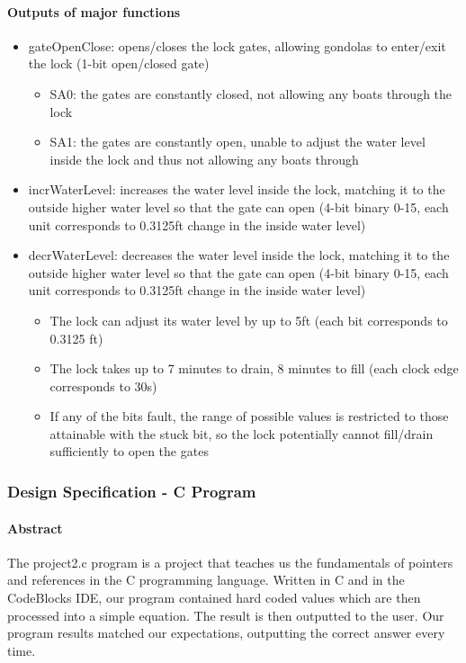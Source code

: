 \documentclass{article}
\begin{document}
      \paragraph{Outputs of major functions}
      \begin{itemize}
        \item gateOpenClose: opens/closes the lock gates, allowing gondolas to enter/exit the lock (1-bit open/closed gate)
        \begin{itemize}
          \item SA0: the gates are constantly closed, not allowing any boats through the lock
          \item SA1: the gates are constantly open, unable to adjust the water level inside the lock and thus not allowing any boats through
        \end{itemize}

        \item incrWaterLevel: increases the water level inside the lock, matching it to the outside higher water level so that the gate can open (4-bit binary 0-15, each unit corresponds to 0.3125ft change in the inside water level)
        \item decrWaterLevel: decreases the water level inside the lock, matching it to the outside higher water level so that the gate can open (4-bit binary 0-15, each unit corresponds to 0.3125ft change in the inside water level)
          \begin{itemize}
            \item The lock can adjust its water level by up to 5ft (each bit corresponds to 0.3125 ft)
            \item The lock takes up to 7 minutes to drain, 8 minutes to fill (each clock edge corresponds to 30s)
            \item If any of the bits fault, the range of possible values is restricted to those attainable with the stuck bit, so the lock potentially cannot fill/drain sufficiently to open the gates
          \end{itemize}
      \end{itemize}

    \subsubsection{Design Specification - C Program}
      \paragraph{Abstract} The project2.c program is a project that teaches us the fundamentals of pointers and references in the C programming language. Written in C and in the CodeBlocks IDE, our program contained hard coded values which are then processed into a simple equation. The result is then outputted to the user. Our program results matched our expectations, outputting the correct answer every time.
\end{document}
